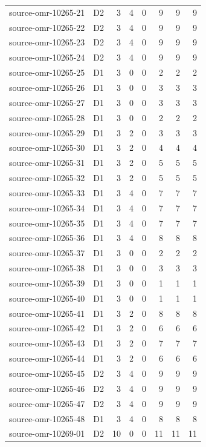 \begin{longtable}{llrrrrrr}
source-omr-10265-21 & D2 & 3 & 4 & 0 & 9 & 9 & 9\\
source-omr-10265-22 & D2 & 3 & 4 & 0 & 9 & 9 & 9\\
source-omr-10265-23 & D2 & 3 & 4 & 0 & 9 & 9 & 9\\
source-omr-10265-24 & D2 & 3 & 4 & 0 & 9 & 9 & 9\\
source-omr-10265-25 & D1 & 3 & 0 & 0 & 2 & 2 & 2\\
source-omr-10265-26 & D1 & 3 & 0 & 0 & 3 & 3 & 3\\
source-omr-10265-27 & D1 & 3 & 0 & 0 & 3 & 3 & 3\\
source-omr-10265-28 & D1 & 3 & 0 & 0 & 2 & 2 & 2\\
source-omr-10265-29 & D1 & 3 & 2 & 0 & 3 & 3 & 3\\
source-omr-10265-30 & D1 & 3 & 2 & 0 & 4 & 4 & 4\\
source-omr-10265-31 & D1 & 3 & 2 & 0 & 5 & 5 & 5\\
source-omr-10265-32 & D1 & 3 & 2 & 0 & 5 & 5 & 5\\
source-omr-10265-33 & D1 & 3 & 4 & 0 & 7 & 7 & 7\\
source-omr-10265-34 & D1 & 3 & 4 & 0 & 7 & 7 & 7\\
source-omr-10265-35 & D1 & 3 & 4 & 0 & 7 & 7 & 7\\
source-omr-10265-36 & D1 & 3 & 4 & 0 & 8 & 8 & 8\\
source-omr-10265-37 & D1 & 3 & 0 & 0 & 2 & 2 & 2\\
source-omr-10265-38 & D1 & 3 & 0 & 0 & 3 & 3 & 3\\
source-omr-10265-39 & D1 & 3 & 0 & 0 & 1 & 1 & 1\\
source-omr-10265-40 & D1 & 3 & 0 & 0 & 1 & 1 & 1\\
source-omr-10265-41 & D1 & 3 & 2 & 0 & 8 & 8 & 8\\
source-omr-10265-42 & D1 & 3 & 2 & 0 & 6 & 6 & 6\\
source-omr-10265-43 & D1 & 3 & 2 & 0 & 7 & 7 & 7\\
source-omr-10265-44 & D1 & 3 & 2 & 0 & 6 & 6 & 6\\
source-omr-10265-45 & D2 & 3 & 4 & 0 & 9 & 9 & 9\\
source-omr-10265-46 & D2 & 3 & 4 & 0 & 9 & 9 & 9\\
source-omr-10265-47 & D2 & 3 & 4 & 0 & 9 & 9 & 9\\
source-omr-10265-48 & D1 & 3 & 4 & 0 & 8 & 8 & 8\\
source-omr-10269-01 & D2 & 10 & 0 & 0 & 11 & 11 & 11\\

\end{longtable}
